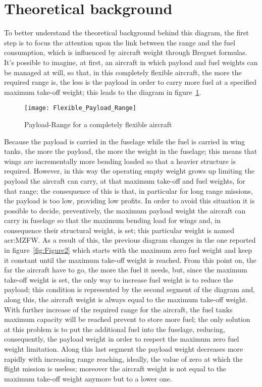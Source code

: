 \section{Theoretical background}
To better understand the theoretical background behind this diagram, the first step is to focus the attention upon the link between the range and the fuel consumption, which is influenced by aircraft weight through Breguet formulas. 
%
It’s possible to imagine, at first, an aircraft in which payload and fuel weights can be managed at will, so that, in this completely flexible aircraft, the more the required range is, the less is the payload in order to carry more fuel at a specified maximum take-off weight; this leads to the diagram in figure~\ref{fig:Figure1}.
%
\begin{figure}[t] 
\centering
\texttt{[image: Flexible\_Payload\_Range]}
\caption{Payload-Range for a completely flexible aircraft}
\label{fig:Figure1}
\end{figure}
%
Because the payload is carried in the fuselage while the fuel is carried in wing tanks, the more the payload, the more the weight in the fuselage; this means that wings are incrementally more bending loaded so that a heavier structure is required. However, in this way the operating empty weight grows up limiting the payload the aircraft can carry, at that maximum take-off and fuel weights, for that range; the consequence of this is that, in particular for long range missions, the payload is too low, providing low profits.
%
In order to avoid this situation it is possible to decide, preventively, the maximum payload weight the aircraft can carry in fuselage so that the maximum bending load for wings and, in consequence their structural weight, is set; this particular weight is named \gls{acr:MZFW}. As a result of this, the previous diagram changes in the one reported in figure~\ref{fig:Figure2} which starts with the maximum zero fuel weight and keep it constant until the maximum take-off weight is reached. From this point on, the far the aircraft have to go, the more the fuel it needs, but, since the maximum take-off weight is set, the only way to increase fuel weight is to reduce the payload; this condition is represented by the second segment of the diagram and, along this, the aircraft weight is always equal to the maximum take-off weight. With further increase of the required range for the aircraft, the fuel tanks maximum capacity will be reached prevent to store more fuel; the only solution at this problem is to put the additional fuel into the fuselage, reducing, consequently, the payload weight in order to respect the maximum zero fuel weight limitation. Along this last segment the payload weight decreases more rapidly with increasing range reaching, ideally, the value of zero at which the flight mission is useless; moreover the aircraft weight is not equal to the maximum take-off weight anymore but to a lower one.

